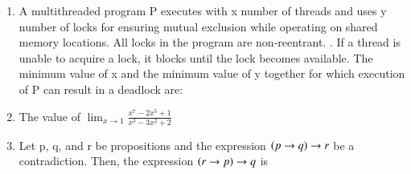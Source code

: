 \documentclass[a4paper, 11pt]{article}
\begin{document}
\begin{enumerate}
    \hfill{}

    \item A multithreaded program P executes with x number of threads and uses y number of locks for ensuring mutual exclusion while operating on shared memory locations. All locks in the program are non-reentrant. . If a thread is unable to acquire a lock, it blocks until the lock becomes available. The minimum value of x and the minimum value of y together for which execution of P can result in a deadlock are:
    \begin{enumerate}
    \end{enumerate}

    \hfill{}

    \item The value of {\Large$\lim_{x\to1}\frac{x^{7}-2x^{5}+1}{x^{3}-3x^{2}+2}$}
    \begin{enumerate}
    \end{enumerate}
    
    \hfill{}
    
    \item Let p, q, and r be propositions and the expression $\left(p\to q\right)\to r$ be a contradiction. Then, the expression $\left(r\to p\right)\to q$ is
    \begin{enumerate}
    \end{enumerate}
    

\end{enumerate}
\end{document}
